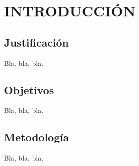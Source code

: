 \section{INTRODUCCIÓN} \label{sec:introduccion}

\subsection{Justificación}

Bla, bla, bla.
    
\subsection{Objetivos}

Bla, bla, bla.

\subsection{Metodología}

Bla, bla, bla.
